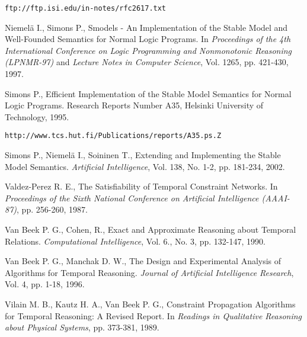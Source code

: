 \documentclass[11pt]{report}
\begin{document}
\begin{thebibliography}{M}
      {\tt ftp://ftp.isi.edu/in-notes/rfc2617.txt}

      Niemel{\"a} I., Simons P.,
      Smodels - An Implementation of the Stable Model and Well-Founded
      Semantics for Normal Logic Programs.
      In {\em Proceedings of the 4th International Conference on Logic Programming and Nonmonotonic Reasoning (LPNMR-97)}
      and {\em Lecture Notes in Computer Science},
      Vol. 1265, pp. 421-430,
      1997.

      Simons P.,
      Efficient Implementation of the Stable Model Semantics for Normal Logic
      Programs.
      Research Reports Number A35, Helsinki University of Technology,
      1995.

      {\tt http://www.tcs.hut.fi/Publications/reports/A35.ps.Z}

      Simons P., Niemel{\"a} I., Soininen T.,
      Extending and Implementing the Stable Model Semantics.
      {\em Artificial Intelligence},
      Vol. 138, No. 1-2, pp. 181-234,
      2002.

      Valdez-Perez R. E.,
      The Satisfiability of Temporal Constraint Networks.
      In {\em Proceedings of the Sixth National Conference on Artificial Intelligence (AAAI-87)},
      pp. 256-260,
      1987.

      Van Beek P. G., Cohen, R.,
      Exact and Approximate Reasoning about Temporal Relations.
      {\em Computational Intelligence},
      Vol. 6., No. 3, pp. 132-147,
      1990.

      Van Beek P. G., Manchak D. W.,
      The Design and Experimental Analysis of Algorithms for Temporal Reasoning.
      {\em Journal of Artificial Intelligence Research},
      Vol. 4, pp. 1-18,
      1996.

      Vilain M. B., Kautz H. A., Van Beek P. G.,
      Constraint Propagation Algorithms for Temporal Reasoning: A Revised Report.
      In {\em Readings in Qualitative Reasoning about Physical Systems},
      pp. 373-381,
      1989.
  \end{thebibliography}
\end{document}
